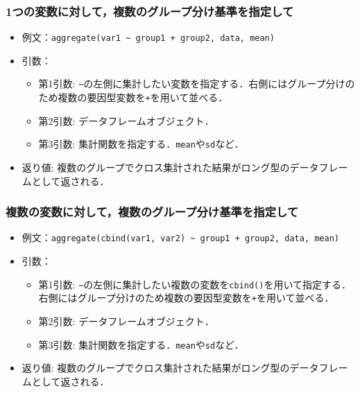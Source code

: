 \documentclass[
  xelatex, ja=standard]{bxjsarticle}
\providecommand{\tightlist}{%
  \setlength{\itemsep}{0pt}\setlength{\parskip}{0pt}}
\begin{document}
\subsubsection{1つの変数に対して，複数のグループ分け基準を指定して}\label{ux3064ux306eux5909ux6570ux306bux5bfeux3057ux3066ux8907ux6570ux306eux30b0ux30ebux30fcux30d7ux5206ux3051ux57faux6e96ux3092ux6307ux5b9aux3057ux3066}

\begin{itemize}
\tightlist
\item
  例文：\texttt{aggregate(var1\ \textasciitilde{}\ group1\ +\ group2,\ data,\ mean)}
\item
  引数：

  \begin{itemize}
  \tightlist
  \item
    第1引数:
    \texttt{\textasciitilde{}}の左側に集計したい変数を指定する．右側にはグループ分けのため複数の要因型変数を\texttt{+}を用いて並べる．
  \item
    第2引数: データフレームオブジェクト．
  \item
    第3引数: 集計関数を指定する．\texttt{mean}や\texttt{sd}など．
  \end{itemize}
\item
  返り値:
  複数のグループでクロス集計された結果がロング型のデータフレームとして返される．
\end{itemize}

\subsubsection{複数の変数に対して，複数のグループ分け基準を指定して}\label{ux8907ux6570ux306eux5909ux6570ux306bux5bfeux3057ux3066ux8907ux6570ux306eux30b0ux30ebux30fcux30d7ux5206ux3051ux57faux6e96ux3092ux6307ux5b9aux3057ux3066}

\begin{itemize}
\item
  例文：\texttt{aggregate(cbind(var1,\ var2)\ \textasciitilde{}\ group1\ +\ group2,\ data,\ mean)}
\item
  引数：

  \begin{itemize}
  \tightlist
  \item
    第1引数:
    \texttt{\textasciitilde{}}の左側に集計したい複数の変数を\texttt{cbind()}を用いて指定する．右側にはグループ分けのため複数の要因型変数を\texttt{+}を用いて並べる．
  \item
    第2引数: データフレームオブジェクト．
  \item
    第3引数: 集計関数を指定する．\texttt{mean}や\texttt{sd}など．
  \end{itemize}
\item
  返り値:
  複数のグループでクロス集計された結果がロング型のデータフレームとして返される．
\end{itemize}
\end{document}
